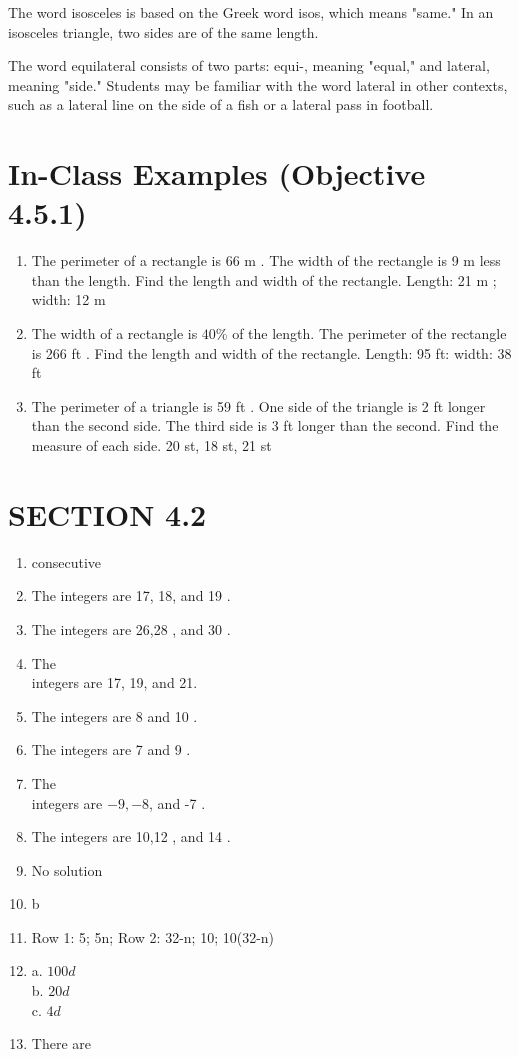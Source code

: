 \documentclass{ximera}
\begin{document}
The word isosceles is based on the Greek word isos, which means "same." In an isosceles triangle, two sides are of the same length.

The word equilateral consists of two parts: equi-, meaning "equal," and lateral, meaning "side." Students may be familiar with the word lateral in other contexts, such as a lateral line on the side of a fish or a lateral pass in football.

\section*{In-Class Examples (Objective 4.5.1)}
\begin{enumerate}
  \item The perimeter of a rectangle is 66 m . The width of the rectangle is 9 m less than the length. Find the length and width of the rectangle. Length: 21 m ; width: 12 m
  \item The width of a rectangle is $40 \%$ of the length. The perimeter of the rectangle is 266 ft . Find the length and width of the rectangle. Length: 95 ft: width: 38 ft
  \item The perimeter of a triangle is 59 ft . One side of the triangle is 2 ft longer than the second side. The third side is 3 ft longer than the second. Find the measure of each side. 20 st, 18 st, 21 st
\end{enumerate}

\section*{SECTION 4.2}
\begin{enumerate}
  \item consecutive
  \item The integers are 17, 18, and 19 .
  \item The integers are 26,28 , and 30 .
  \item The\\
integers are 17, 19, and 21.
  \item The integers are 8 and 10 .
  \item The integers are 7 and 9 .
  \item The\\
integers are $-9,-8$, and -7 .
  \item The integers are 10,12 , and 14 .
  \item No solution
  \item b
  \item Row 1: 5; 5n; Row 2: 32-n; 10; 10(32-n)
  \item a. $100 d$\\
b. $20 d$\\
c. $4 d$
  \item There are
\end{enumerate}
\end{document}
